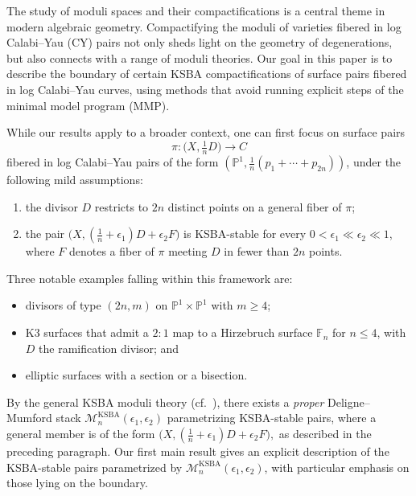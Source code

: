 \documentclass[a4paper,12pt]{amsart}
\newcommand{\mtc}[1]{\mathcal{#1}}
\newcommand{\bF}{\mathbb{F}}
\DeclareMathOperator{\KSBA}{\mathrm{KSBA}}
\theoremstyle{definition}
\theoremstyle{remark}
\begin{document}
The study of moduli spaces and their compactifications is a central theme in modern algebraic geometry. Compactifying the moduli of varieties fibered in log Calabi–Yau (CY) pairs not only sheds light on the geometry of degenerations, but also connects with a range of moduli theories. Our goal in this paper is to describe the boundary of certain KSBA compactifications of surface pairs fibered in log Calabi–Yau curves, using methods that avoid running explicit steps of the minimal model program (MMP).

\medskip
While our results apply to a broader context, one can first focus on surface pairs
\[
\pi : \bigl(X, \tfrac{1}{n}D\bigr) \longrightarrow C
\]
fibered in log Calabi–Yau pairs of the form
\((\mathbb{P}^1, \tfrac{1}{n}(p_1+\cdots+p_{2n}))\),
under the following mild assumptions:
\begin{enumerate}
    \item the divisor $D$ restricts to $2n$ distinct points on a general fiber of $\pi$;
    \item the pair $\bigl(X, (\tfrac{1}{n}+\epsilon_1)D+\epsilon_2F\bigr)$ is KSBA-stable for every
    $0 < \epsilon_1 \ll \epsilon_2 \ll 1$, where $F$ denotes a fiber of $\pi$ meeting $D$ in fewer than $2n$ points.
\end{enumerate}
Three notable examples falling within this framework are:
\begin{itemize}
    \item divisors of type $(2n,m)$ on $\mathbb{P}^1 \times \mathbb{P}^1$ with $m \geq 4$;
    \item K3 surfaces that admit a $2\!:\!1$ map to a Hirzebruch surface $\bF_n$ for $n \leq 4$, with $D$ the ramification divisor; and
    \item elliptic surfaces with a section or a bisection.
\end{itemize}

\medskip
By the general KSBA moduli theory (cf.~\cite{Kol23}), there exists a \emph{proper} Deligne--Mumford stack $\mtc{M}^{\KSBA}_n(\epsilon_1,\epsilon_2)$ parametrizing KSBA-stable pairs, where a general member is of the form $\bigl(X, (\tfrac{1}{n}+\epsilon_1)D + \epsilon_2 F\bigr),$ as described in the preceding paragraph. Our first main result gives an explicit description of the KSBA-stable pairs parametrized by $\mtc{M}^{\KSBA}_n(\epsilon_1,\epsilon_2)$, with particular emphasis on those lying on the boundary.
\end{document}
